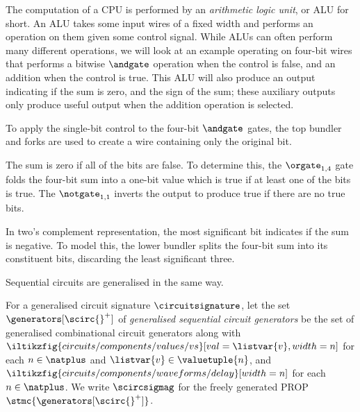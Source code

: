 \documentclass{lmcs}
\begin{document}
\begin{exa}[ALU]
    The computation of a CPU is performed by an \emph{arithmetic logic unit},
    or ALU for short.
    An ALU takes some input wires of a fixed width and performs an operation
    on them given some control signal.
    While ALUs can often perform many different operations, we will look at an
    example operating on four-bit wires that performs a bitwise \(\andgate\)
    operation when the control is false, and an addition when the control is
    true.
    This ALU will also produce an output indicating if the sum is zero, and
    the sign of the sum; these auxiliary outputs only produce useful output when
    the addition operation is selected.

    \begin{center}
    \end{center}

    To apply the single-bit control to the four-bit \(\andgate\) gates, the
    top bundler and forks are used to create a wire containing only the
    original bit.

    The sum is zero if all of the bits are false.
    To determine this, the \(\orgate_{1,4}\) gate folds the four-bit sum into
    a one-bit value which is true if at least one of the bits is true.
    The \(\notgate_{1,1}\) inverts the output to produce true if there are no
    true bits.

    In two's complement representation, the most significant bit indicates if
    the sum is negative.
    To model this, the lower bundler splits the four-bit sum into its
    constituent bits, discarding the least significant three.
\end{exa}

Sequential circuits are generalised in the same way.

\begin{defi}
    For a generalised circuit signature \(\circuitsignature\), let the set
    \(\generators[\scirc{}^+]\) of
    \emph{generalised sequential circuit generators} be the set of
    generalised combinational circuit generators along with
    \(
    \iltikzfig{circuits/components/values/vs}[val=\listvar{v},width=n]
    \) for each \(n \in \natplus\) and \(\listvar{v} \in \valuetuple{n}\), and
    \(
    \iltikzfig{circuits/components/waveforms/delay}[width=n]
    \) for each \(n \in \natplus\).
    We write \(\scircsigmag\) for the freely generated PROP
    \(\stmc{\generators[\scirc{}^+]}\).
\end{defi}
\end{document}
